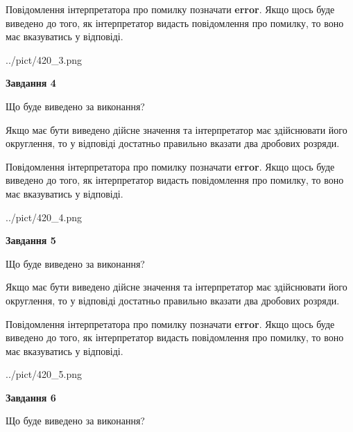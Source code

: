 \documentclass[12pt, ukrainian]{article}
\begin{document}
{\begin {Large}
Повідомлення інтерпретатора про помилку позначати \textbf{error}.
Якщо щось буде виведено до того, як інтерпретатор видасть повідомлення про помилку, 
то воно має вказуватись у відповіді. \par

\begin{center}
	{../pict/420_3.png}
\end{center}
\newpage

{\begin {center}\textbf{Завдання 4}\end {center}}\par
Що буде виведено за виконання? \par

Якщо має бути виведено дійсне значення та інтерпретатор має здійснювати його округлення, 
то у відповіді достатньо правильно вказати два дробових розряди.

Повідомлення інтерпретатора про помилку позначати \textbf{error}.
Якщо щось буде виведено до того, як інтерпретатор видасть повідомлення про помилку, 
то воно має вказуватись у відповіді. \par

\begin{center}
	{../pict/420_4.png}
\end{center}
\newpage

{\begin {center}\textbf{Завдання 5}\end {center}}\par
Що буде виведено за виконання? \par

Якщо має бути виведено дійсне значення та інтерпретатор має здійснювати його округлення, 
то у відповіді достатньо правильно вказати два дробових розряди.

Повідомлення інтерпретатора про помилку позначати \textbf{error}.
Якщо щось буде виведено до того, як інтерпретатор видасть повідомлення про помилку, 
то воно має вказуватись у відповіді. \par

\begin{center}
	{../pict/420_5.png}
\end{center}
\newpage

{\begin {center}\textbf{Завдання 6}\end {center}}\par
Що буде виведено за виконання? \par


\end{Large}}
\end{document}
